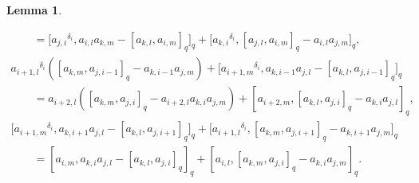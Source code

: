 \documentclass[10pt,a4paper]{amsart}
\numberwithin{equation}{section}
\def\lr#1{\left[#1\right]}
\def\d{\delta}
\newtheorem{Lemma}[Theorem]{Lemma}
\begin{document}
\begin{Lemma}
\begin{enumerate}
\begin{gather}
\qquad
=\bigl[{a_{j,i}}^{\d_i},a_{i,l}a_{k,m}-\lr{a_{k,l},a_{i,m}}_q\bigr]_q +\bigl[{a_{k,i}}^{\d_i},\lr{a_{j,l},a_{i,m}}_q-a_{i,l}a_{j,m}\bigr]_q, \label{eqn:j2}\\
{a_{i+1,l}}^{\d_i}(\lr{a_{k,m},a_{j,i-1}}_q-a_{k,i-1}a_{j,m})+\bigl[{a_{i+1,m}}^{\d_i}, a_{k,i-1}a_{j,l}-\lr{a_{k,l},a_{j,i-1}}_q\bigr]_q \nonumber \\
\qquad
=a_{i+2,l}(\lr{a_{k,m}, a_{j,i}}_q -a_{i+2,l}a_{k,i}a_{j,m})+[a_{i+2,m}, \lr{a_{k,l},a_{j,i}}_q-a_{k,i}a_{j,l}]_q, \label{eqn:j3}\\
\bigl[{a_{i+1,m}}^{\d_i},a_{k,i+1}a_{j,l}-\lr{a_{k,l},a_{j,i+1}}_q\bigr]_q +\bigl[{a_{i+1,l}}^{\d_i},\lr{a_{k,m},a_{j,i+1}}_q-a_{k,i+1}a_{j,m}\bigr]_q \nonumber \\
\qquad
=[a_{i,m},a_{k,i}a_{j,l} -\lr{a_{k,l},a_{j,i}}_q]_q +[a_{i,l},\lr{a_{k,m},a_{j,i}}_q-a_{k,i}a_{j,m}]_q. \label{eqn:j4}
\end{gather}
\end{enumerate}
\end{Lemma}
\end{document}
